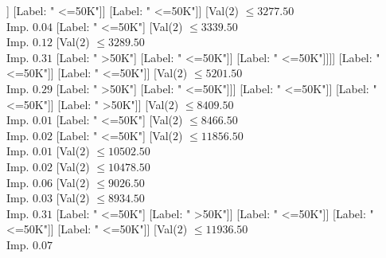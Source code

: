 \documentclass[margin=10pt]{standalone}
\begin{document}
\begin{forest}
																			[Val($2$) $ \leq 4615.50$ \\ Imp. $0.01$
																				[Val($2$) $ \leq 4334.50$ \\ Imp. $0.02$
																					[Val($2$) $ \leq 1477.50$ \\ Imp. $0.01$
																						[Val($2$) $ \leq 1416.50$ \\ Imp. $0.02$
																							[Val($2$) $ \leq 997.50$ \\ Imp. $0.04$
																								[Val($2$) $ \leq 993.50$ \\ Imp. $0.06$
																									[Label: " <=50K"]
																									[Label: " >50K"]]
																								[Label: " <=50K"]]
																							[Label: " <=50K"]]
																						[Val($2$) $ \leq 3277.50$ \\ Imp. $0.04$
																							[Label: " <=50K"]
																							[Val($2$) $ \leq 3339.50$ \\ Imp. $0.12$
																								[Val($2$) $ \leq 3289.50$ \\ Imp. $0.31$
																									[Label: " >50K"]
																									[Label: " <=50K"]]
																								[Label: " <=50K"]]]]
																					[Label: " <=50K"]]
																				[Label: " <=50K"]]
																			[Val($2$) $ \leq 5201.50$ \\ Imp. $0.29$
																				[Label: " >50K"]
																				[Label: " <=50K"]]]
																		[Label: " <=50K"]]
																	[Label: " <=50K"]]
																[Label: " >50K"]]
															[Val($2$) $ \leq 8409.50$ \\ Imp. $0.01$
																[Label: " <=50K"]
																[Val($2$) $ \leq 8466.50$ \\ Imp. $0.02$
																	[Label: " <=50K"]
																	[Val($2$) $ \leq 11856.50$ \\ Imp. $0.01$
																		[Val($2$) $ \leq 10502.50$ \\ Imp. $0.02$
																			[Val($2$) $ \leq 10478.50$ \\ Imp. $0.06$
																				[Val($2$) $ \leq 9026.50$ \\ Imp. $0.03$
																					[Val($2$) $ \leq 8934.50$ \\ Imp. $0.31$
																						[Label: " <=50K"]
																						[Label: " >50K"]]
																					[Label: " <=50K"]]
																				[Label: " <=50K"]]
																			[Label: " <=50K"]]
																		[Val($2$) $ \leq 11936.50$ \\ Imp. $0.07$

\end{forest}
\end{document}
